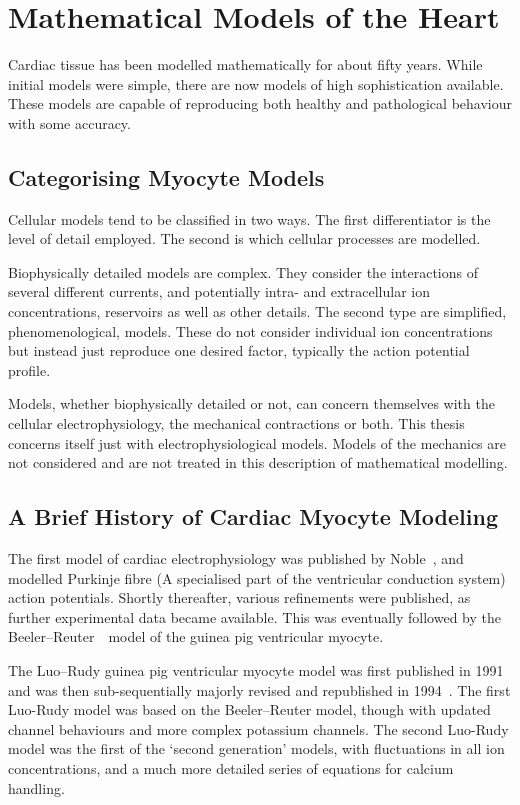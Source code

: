 \section{Mathematical Models of the Heart}

Cardiac tissue has been modelled mathematically for about fifty years.
While initial models were simple, there are now models of high sophistication
available.
These models are capable of reproducing both healthy and pathological behaviour
with some accuracy.

\subsection{Categorising Myocyte Models}

Cellular models tend to be classified in two ways.
The first differentiator is the level of detail employed.
The second is which cellular processes are modelled.

Biophysically detailed models are complex.
They consider the interactions of several different currents, and potentially
intra- and extracellular ion concentrations, reservoirs as well as other
details.
The second type are simplified, phenomenological, models.
These do not consider individual ion concentrations but instead just reproduce
one desired factor, typically the action potential profile.

Models, whether biophysically detailed or not, can concern themselves with the
cellular electrophysiology, the mechanical contractions or both.
This thesis concerns itself just with electrophysiological models.
Models of the mechanics are not considered and are not treated in this
description of mathematical modelling.

\subsection{A Brief History of Cardiac Myocyte Modeling}

The first model of cardiac electrophysiology was published by
Noble~\cite{Noble1962}, and modelled Purkinje fibre (A specialised part of the
ventricular conduction system) action potentials.
Shortly thereafter, various refinements were published, as further experimental
data became available.
This was eventually followed by the Beeler--Reuter~\cite{Beeler1977}\ model of
the guinea pig ventricular myocyte.

The Luo--Rudy guinea pig ventricular myocyte model was first published in
1991~\cite{Luo1991} and was then sub-sequentially majorly revised and
republished in 1994~\cite{Luo1994}.
The first Luo-Rudy model was based on the Beeler--Reuter model, though with updated channel behaviours
and more complex potassium channels.
The second Luo-Rudy model was the first of the `second generation' models,
with fluctuations in all ion concentrations, and a much more detailed series of
equations for calcium handling.

